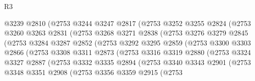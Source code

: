 \begin{lexlean}{R3}
\begin{coremodule}
                    @3239
                    @2810
                    (@2753
                      @3244
                      @3247
                      @2817
                      (@2753
                        @3252
                        @3255
                        @2824
                        (@2753
                          @3260
                          @3263
                          @2831
                          (@2753
                            @3268
                            @3271
                            @2838
                            (@2753
                              @3276
                              @3279
                              @2845
                              (@2753
                                @3284
                                @3287
                                @2852
                                (@2753
                                  @3292
                                  @3295
                                  @2859
                                  (@2753
                                    @3300
                                    @3303
                                    @2866
                                    (@2753
                                      @3308
                                      @3311
                                      @2873
                                      (@2753
                                        @3316
                                        @3319
                                        @2880
                                        (@2753
                                          @3324
                                          @3327
                                          @2887
                                          (@2753
                                            @3332
                                            @3335
                                            @2894
                                            (@2753
                                              @3340
                                              @3343
                                              @2901
                                              (@2753
                                                @3348
                                                @3351
                                                @2908
                                                (@2753
                                                  @3356
                                                  @3359
                                                  @2915
                                                  (@2753

\end{coremodule}
\end{lexlean}
